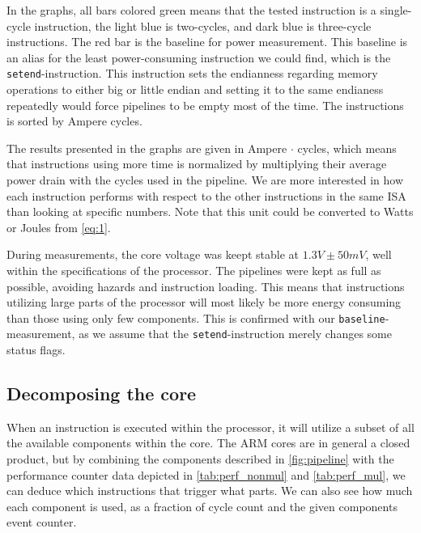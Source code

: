 In the graphs, all bars colored green means that the tested instruction is a
single-cycle instruction, the light blue is two-cycles, and dark blue is
three-cycle instructions. The red bar is the baseline for power measurement.
This baseline is an alias for the least power-consuming instruction we could
find, which is the \texttt{setend}-instruction. This instruction sets the
endianness regarding memory operations to either big or little endian
\cite{armcompilerref} and setting it to the same endianess repeatedly would
force pipelines to be empty most of the time. The instructions is sorted by
Ampere cycles.

The results presented in the graphs are given in Ampere $\cdot$ cycles, which
means that instructions using more time is normalized by multiplying their
average power drain with the cycles used in the pipeline. We are more interested
in how each instruction performs with respect to the other instructions in the
same ISA than looking at specific numbers. Note that this unit could be
converted to Watts or Joules from \autoref{eq:1}.

During measurements, the core voltage was keept stable at $1.3V\pm50mV$, well
within the specifications of the processor. The pipelines were kept as full as
possible, avoiding hazards and instruction loading. This means that instructions
utilizing large parts of the processor will most likely be more energy consuming
than those using only few components. This is confirmed with our
\texttt{baseline}-measurement, as we assume that the \texttt{setend}-instruction
merely changes some status flags.

\subsection{Decomposing the core}
When an instruction is executed within the processor, it will utilize a subset
of all the available components within the core. The ARM cores are in general a
closed product, but by combining the components described in
\autoref{fig:pipeline} with the performance counter data depicted in
\autoref{tab:perf_nonmul} and \autoref{tab:perf_mul}, we can deduce which
instructions that trigger what parts. We can also see how much each component is
used, as a fraction of cycle count and the given components event counter.

